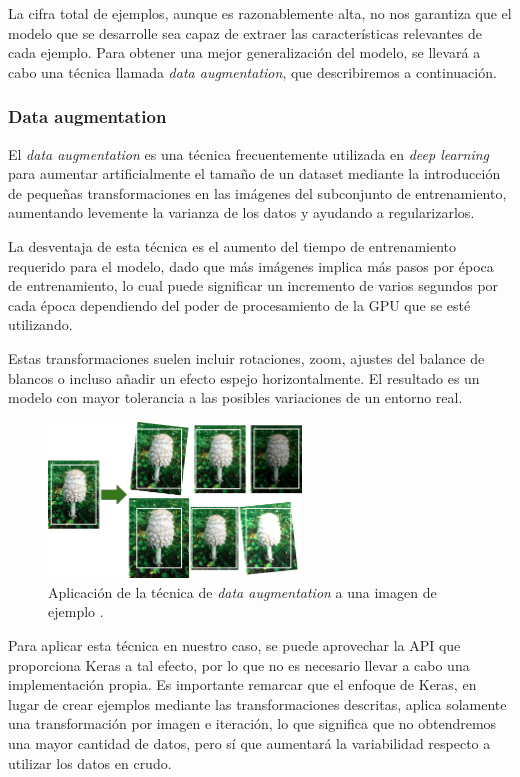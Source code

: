 La cifra total de ejemplos, aunque es razonablemente alta, no nos garantiza que el modelo que se desarrolle sea capaz de extraer las características relevantes de cada ejemplo. Para obtener una mejor generalización del modelo, se llevará a cabo una técnica llamada \textit{data augmentation}, que describiremos a continuación.

\subsubsection*{Data augmentation}

El \textit{data augmentation} es una técnica frecuentemente utilizada en \textit{deep learning} para aumentar artificialmente el tamaño de un dataset mediante la introducción de pequeñas transformaciones en las imágenes del subconjunto de entrenamiento, aumentando levemente la varianza de los datos y ayudando a regularizarlos.

La desventaja de esta técnica es el aumento del tiempo de entrenamiento requerido para el modelo, dado que más imágenes implica más pasos por época de entrenamiento, lo cual puede significar un incremento de varios segundos por cada época dependiendo del poder de procesamiento de la GPU que se esté utilizando.

Estas transformaciones suelen incluir rotaciones, zoom, ajustes del balance de blancos o incluso añadir un efecto espejo horizontalmente. El resultado es un modelo con mayor tolerancia a las posibles variaciones de un entorno real.

\begin{figure}[H]
  \centering
  \includegraphics[width=0.6\textwidth]{images/dataAug}
  \caption{Aplicación de la técnica de \textit{data augmentation} a una imagen de ejemplo \cite{book:homl}.}
  \label{fig:dataAug}
\end{figure}


Para aplicar esta técnica en nuestro caso, se puede aprovechar la API que proporciona Keras a tal efecto, por lo que no es necesario llevar a cabo una implementación propia. Es importante remarcar que el enfoque de Keras, en lugar de crear ejemplos mediante las transformaciones descritas, aplica solamente una transformación por imagen e iteración, lo que significa que no obtendremos una mayor cantidad de datos, pero sí que aumentará la variabilidad respecto a utilizar los datos en crudo.


